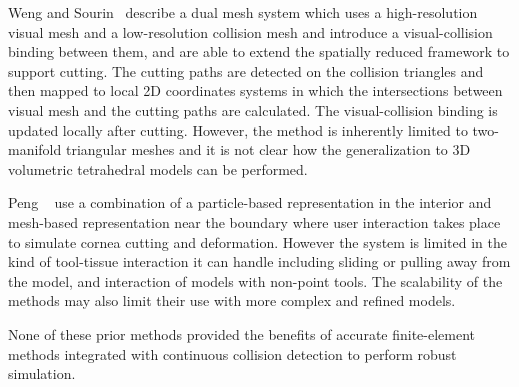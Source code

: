 Weng and Sourin~\cite{weng:sym:2018} describe a dual mesh system which uses a high-resolution visual mesh and a low-resolution collision mesh and introduce a visual-collision binding between them, and are able to extend the spatially reduced framework to support cutting. The cutting paths are detected on the collision triangles and then mapped to local 2D coordinates systems in which the intersections between visual mesh and the cutting paths are calculated.  The visual-collision binding is updated locally after cutting. However, the method is inherently limited to two-manifold triangular meshes and it is not clear how the generalization to 3D volumetric tetrahedral models can be performed.

Peng \etal~\cite{peng:mta:2019} use a combination of a particle-based representation in the interior and mesh-based representation near the boundary where user interaction takes place to simulate cornea cutting and deformation. However the system is limited in the kind of tool-tissue interaction it can handle including sliding or pulling away from the model, and interaction of models with non-point tools. The scalability of the methods may also limit their use with more complex and refined models.

None of these prior methods provided the benefits of accurate finite-element methods integrated with continuous collision detection to perform robust simulation.
